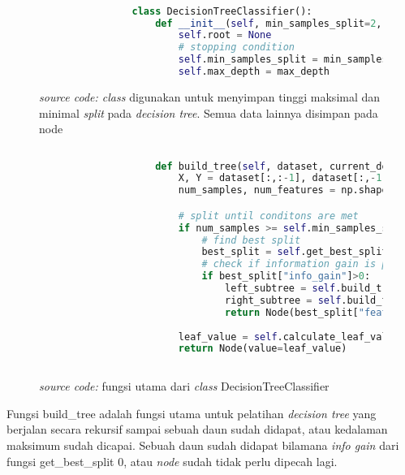 		\begin{figure}[H]
			\begin{lstlisting}[language=Python, basicstyle=\tiny]

				class DecisionTreeClassifier():
					def __init__(self, min_samples_split=2, max_depth=2):
						self.root = None
						# stopping condition
						self.min_samples_split = min_samples_split
						self.max_depth = max_depth

			\end{lstlisting}
			\caption{\emph{source code: class} digunakan untuk menyimpan tinggi maksimal dan minimal 
			\textit{split} pada \emph{decision tree}. Semua data lainnya disimpan pada node}
			\label{code: DecisionTreeClassifier class}
		\end{figure}

		\begin{figure}[H]
			\begin{lstlisting}[language=Python, basicstyle=\tiny]
						
					def build_tree(self, dataset, current_depth = 0):
						X, Y = dataset[:,:-1], dataset[:,-1]
						num_samples, num_features = np.shape(X)

						# split until conditons are met
						if num_samples >= self.min_samples_split and current_depth <= self.max_depth:
							# find best split
							best_split = self.get_best_split(dataset, num_samples, num_features)
							# check if information gain is positive
							if best_split["info_gain"]>0:
								left_subtree = self.build_tree(best_split["dataset_left"], current_depth+1)
								right_subtree = self.build_tree(best_split["dataset_right"], current_depth+1)
								return Node(best_split["feature_index"], best_split["threshold"], left_subtree, right_subtree, best_split["info_gain"])
							
						leaf_value = self.calculate_leaf_value(Y)
						return Node(value=leaf_value)
					
			\end{lstlisting}
			\caption{\emph{source code:} fungsi utama dari \emph{class} DecisionTreeClassifier}
			\label{code: build tree function}
		\end{figure}

		Fungsi build\_tree adalah fungsi utama untuk pelatihan \emph{decision tree} yang berjalan secara 
		rekursif sampai sebuah daun sudah didapat, atau kedalaman maksimum sudah dicapai. 
		Sebuah daun sudah didapat bilamana \textit{info gain} dari fungsi get\_best\_split 0, atau \textit{node} 
		sudah tidak perlu dipecah lagi.

